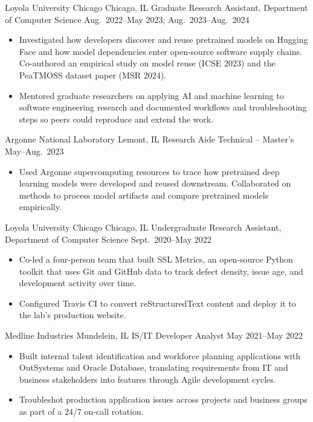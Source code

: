 \cventry
    {Loyola University Chicago}
    {Chicago, IL}
    {Graduate Research Assistant, Department of Computer Science}
    {Aug.\ 2022--May 2023; Aug.\ 2023--Aug.\ 2024}

\begin{itemize}
    \item Investigated how developers discover and reuse pretrained
        models on Hugging Face and how model dependencies enter open-source
        software supply chains. Co-authored an empirical study on model
        reuse (ICSE 2023) and the PeaTMOSS dataset paper (MSR 2024).
    \item Mentored graduate researchers on applying AI and machine
        learning to software engineering research and documented
        workflows and troubleshooting steps so peers could reproduce
        and extend the work.
\end{itemize}

\cventry
    {Argonne National Laboratory}
    {Lemont, IL}
    {Research Aide Technical -- Master's}
    {May--Aug.\ 2023}

\begin{itemize}
    \item Used Argonne supercomputing resources to trace how pretrained
        deep learning models were developed and reused downstream.
        Collaborated on methods to process model artifacts and compare
        pretrained models empirically.
\end{itemize}

\cventry
    {Loyola University Chicago}
    {Chicago, IL}
    {Undergraduate Research Assistant, Department of Computer Science}
    {Sept.\ 2020--May 2022}

\begin{itemize}
    \item Co-led a four-person team that built SSL Metrics, an open-source
        Python toolkit that uses Git and GitHub data to track defect
        density, issue age, and development activity over time.
    \item Configured Travis CI to convert reStructuredText content and
        deploy it to the lab's production website.
\end{itemize}

\cventry
    {Medline Industries}
    {Mundelein, IL}
    {IS/IT Developer Analyst}
    {May 2021--May 2022}

\begin{itemize}
    \item Built internal talent identification and workforce planning
        applications with OutSystems and Oracle Database, translating
        requirements from IT and business stakeholders into features
        through Agile development cycles.
    \item Troubleshot production application issues across projects and
        business groups as part of a 24/7 on-call rotation.
\end{itemize}